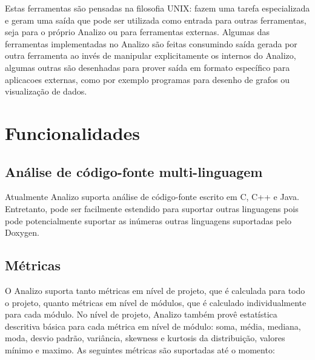 Estas ferramentas são pensadas na filosofia UNIX: fazem uma tarefa
especializada e geram uma saída que pode ser utilizada como entrada para outras
ferramentas, seja para o próprio Analizo ou para ferramentas externas. Algumas das
ferramentas implementadas no Analizo são feitas consumindo saída gerada por
outra ferramenta ao invés de manipular explicitamente os internos do Analizo,
algumas outras são desenhadas para prover saída em formato específico para
aplicacoes externas, como por exemplo programas para desenho de grafos ou
visualização de dados.

\section{Funcionalidades}\label{funcionalidades}

\subsection{Análise de código-fonte multi-linguagem}

Atualmente Analizo suporta análise de código-fonte escrito em C, C++ e Java.
Entretanto, pode ser facilmente estendido para suportar outras linguagens pois
pode potencialmente suportar as inúmeras outras linguagens suportadas pelo Doxygen.

\subsection{Métricas}\label{metricas}

O Analizo suporta tanto métricas em nível de projeto, que é calculada para todo o projeto,
quanto métricas em nível de módulos, que é calculado individualmente para cada módulo.
No nível de projeto, Analizo também provê estatística descritiva básica para cada métrica em
nível de módulo: soma, média, mediana, moda, desvio padrão, variância, skewness e kurtosis da
distribuição, valores mínimo e maximo. As seguintes métricas são suportadas até o momento:

